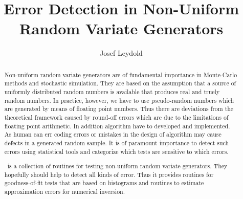 
\subject{\Huge\rvgtest}

\title{Error Detection in Non-Uniform Random Variate Generators}
\author{Josef Leydold}
\publishers{%
  Institute for Statistics and Mathematics, WU Vienna, Austria}


\maketitle


\begin{abstract}
  \noindent
  Non-uniform random variate generators are of fundamental importance
  in Monte-Carlo methods and stochastic simulation. They are based on
  the assumption that a source of uniformly distributed random numbers
  is available that produces real and truely random numbers.
  In practice, however, we have to use pseudo-random numbers which are
  generated by means of floating point numbers.
  Thus there are deviations from the theoretical framework caused by 
  round-off errors which are due to the limitations of floating point
  arithmetic. In addition algorithm have to developed and
  implemented. As human can err coding errors or mistakes in the
  design of algorithm may cause defects in a generated random sample.
  It is of paramount importance to detect such errors using
  statistical tools and categorize which tests are sensitive to which
  errors. 

  \rvgtest\ is a collection of routines for testing non-uniform random
  variate generators. They hopefully should help to detect all kinds
  of error. Thus it provides routines for goodness-of-fit tests that
  are based on histograms and routines to estimate approximation
  errors for numerical inversion.
\end{abstract}


\noindent 

